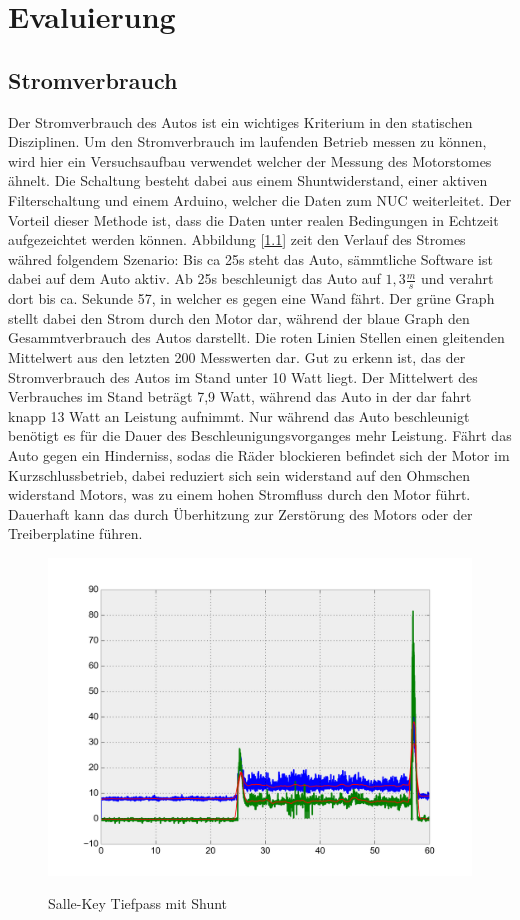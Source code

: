 \chapter{Evaluierung}

\section{Stromverbrauch}

Der Stromverbrauch des Autos ist ein wichtiges Kriterium in den statischen Disziplinen. Um den Stromverbrauch im laufenden Betrieb messen zu können, wird hier ein Versuchsaufbau verwendet welcher der Messung des
Motorstomes ähnelt. Die Schaltung besteht dabei aus einem Shuntwiderstand, einer aktiven Filterschaltung und einem Arduino, welcher die Daten zum NUC weiterleitet. Der Vorteil dieser Methode ist, dass die Daten
unter realen Bedingungen in Echtzeit aufgezeichtet werden können. Abbildung [\ref{fig:Strom}] zeit den Verlauf des Stromes währed folgendem Szenario: Bis ca 25s steht das Auto, sämmtliche Software ist dabei auf 
dem Auto aktiv. Ab 25s beschleunigt das Auto auf $1,3\frac{m}{s}$ und verahrt dort bis ca. Sekunde 57, in welcher es gegen eine Wand fährt. Der grüne Graph stellt dabei den Strom durch den Motor dar, während
der blaue Graph den Gesammtverbrauch des Autos darstellt. Die roten Linien Stellen einen gleitenden Mittelwert aus den letzten 200 Messwerten dar. Gut zu erkenn ist, das der Stromverbrauch des Autos im Stand unter 
10 Watt liegt. Der Mittelwert des Verbrauches im Stand beträgt 7,9 Watt, während das Auto in der dar fahrt knapp 13 Watt an Leistung aufnimmt. Nur während das Auto beschleunigt benötigt es für die Dauer
des Beschleunigungsvorganges mehr Leistung. Fährt das Auto gegen ein Hinderniss, sodas die Räder blockieren befindet sich der Motor im Kurzschlussbetrieb, dabei reduziert sich sein widerstand auf den Ohmschen widerstand
Motors, was zu einem hohen Stromfluss durch den Motor führt. Dauerhaft kann das durch Überhitzung zur Zerstörung des Motors oder der Treiberplatine führen.


\begin{figure}[H]
\centering
\includegraphics[width=.8\textwidth]{Strom/Power.png}\\
\caption{Salle-Key Tiefpass mit Shunt}%
\label{fig:Strom}
\end{figure}






